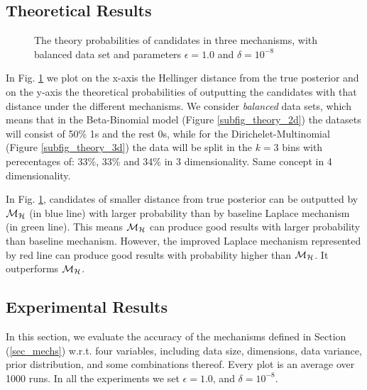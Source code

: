 \documentclass{article}
\begin{document}
\subsection{Theoretical Results}

\begin{figure}
\begin{center}
\centering
\caption{The theory probabilities of candidates in three mechanisms, with balanced data set and parameters $\epsilon = 1.0$ and $\delta = 10^{-8}$ }
\label{fig_theory}
\end{center}
\end{figure}
In Fig. \ref{fig_theory} we plot on the x-axis the Hellinger distance from the true posterior and on the y-axis the theoretical probabilities of outputting the candidates with that distance under the different mechanisms. We consider \emph{balanced} data sets, which means that in the Beta-Binomial model (Figure \ref{subfig_theory_2d}) the datasets will consist of 50\% 1s and the rest 0s, while for the
Dirichelet-Multinomial (Figure  \ref{subfig_theory_3d})
the data will be split in the $k=3$ bins with perecentages of: 33\%, 33\% and 34\% in 3 dimensionality. Same concept in 4 dimensionality.

In Fig. \ref{fig_theory}, candidates of smaller distance from true posterior can be outputted by $\mathcal{M}_{\mathcal{H}}$ (in blue line) with larger probability than by baseline Laplace mechanism (in green line). This means $\mathcal{M}_{\mathcal{H}}$ can produce good results with larger probability than baseline mechanism. However, the improved Laplace mechanism represented by red line can produce good results with probability higher than $\mathcal{M}_{\mathcal{H}}$. It outperforms $\mathcal{M}_{\mathcal{H}}$.


\subsection{Experimental Results}
\label{subsec_vs_variables}

In this section, we evaluate the accuracy of the mechanisms defined in
Section (\ref{sec_mechs}) w.r.t. four variables, including data size, dimensions,
data variance, prior distribution, and some combinations thereof.
Every plot is an average over 1000 runs. In all the experiments we set
$\epsilon = 1.0$, and $\delta = 10^{-8}$.
\end{document}
